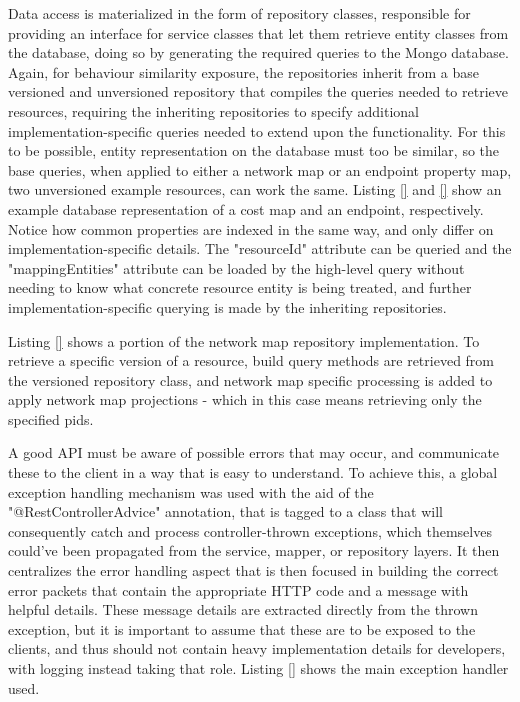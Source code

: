 
    Data access is materialized in the form of repository classes, responsible for providing an interface for service classes that let them retrieve entity classes from the database, doing so by generating the required queries to the Mongo database.
    Again, for behaviour similarity exposure, the repositories inherit from a base versioned and unversioned repository that compiles the queries needed to retrieve resources, requiring the inheriting repositories to specify additional implementation-specific queries needed to extend upon the functionality.
    For this to be possible, entity representation on the database must too be similar, so the base queries, when applied to either a network map or an endpoint property map, two unversioned example resources, can work the same.
    Listing \ref{} and \ref{} show an example database representation of a cost map and an endpoint, respectively.
    Notice how common properties are indexed in the same way, and only differ on implementation-specific details.
    The "resourceId" attribute can be queried and the "mappingEntities" attribute can be loaded by the high-level query without needing to know what concrete resource entity is being treated, and further implementation-specific querying is made by the inheriting repositories.


    Listing \ref{} shows a portion of the network map repository implementation.
    To retrieve a specific version of a resource, build query methods are retrieved from the versioned repository class, and network map specific processing is added to apply network map projections - which in this case means retrieving only the specified pids.

    A good API must be aware of possible errors that may occur, and communicate these to the client in a way that is easy to understand.
    To achieve this, a global exception handling mechanism was used with the aid of the "@RestControllerAdvice" annotation, that is tagged to a class that will consequently catch and process controller-thrown exceptions, which themselves could've been propagated from the service, mapper, or repository layers.
    It then centralizes the error handling aspect that is then focused in building the correct error packets that contain the appropriate HTTP code and a message with helpful details.
    These message details are extracted directly from the thrown exception, but it is important to assume that these are to be exposed to the clients, and thus should not contain heavy implementation details for developers, with logging instead taking that role.
    Listing \ref{} shows the main exception handler used.


